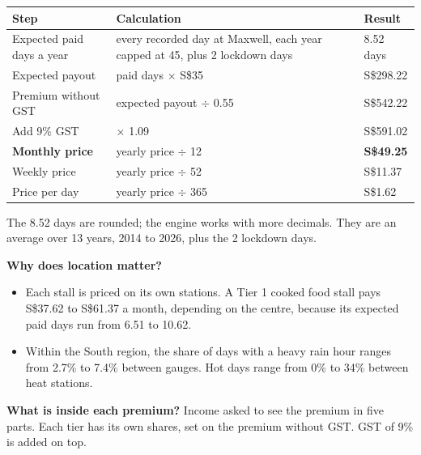 \documentclass[11pt,a4paper]{article}
\newcommand{\head}{\rowcolor{soft}}
\newcommand{\sgd}{\textup{S\$}}
\begin{document}
\begin{center}
\small
\begin{tabularx}{\textwidth}{|L{4.2cm}|Y|R{4.2cm}|}
\hline
\head \textbf{Step} & \textbf{Calculation} & \textbf{Result} \\
\hline
Expected paid days a year & every recorded day at Maxwell, each year capped at 45, plus 2 lockdown days & 8.52 days \\
\hline
Expected payout & paid days $\times$ \sgd 35 & \sgd 298.22 \\
\hline
Premium without GST & expected payout $\div$ 0.55 & \sgd 542.22 \\
\hline
Add 9\% GST & $\times$ 1.09 & \sgd 591.02 \\
\hline
\textbf{Monthly price} & yearly price $\div$ 12 & \textbf{\sgd 49.25} \\
\hline
Weekly price & yearly price $\div$ 52 & \sgd 11.37 \\
\hline
Price per day & yearly price $\div$ 365 & \sgd 1.62 \\
\hline
\end{tabularx}
\end{center}

The 8.52 days are rounded; the engine works with more decimals. They are an average over 13 years, 2014 to 2026, plus the 2 lockdown days.

\textbf{Why does location matter?}
\begin{itemize}[leftmargin=1.2em]
  \item Each stall is priced on its own stations. A Tier 1 cooked food stall pays \sgd 37.62 to \sgd 61.37 a month, depending on the centre, because its expected paid days run from 6.51 to 10.62.
  \item Within the South region, the share of days with a heavy rain hour ranges from 2.7\% to 7.4\% between gauges. Hot days range from 0\% to 34\% between heat stations.\cite{team-data}
\end{itemize}

\textbf{What is inside each premium?} Income asked to see the premium in five parts. Each tier has its own shares, set on the premium without GST. GST of 9\% is added on top.
\end{document}
